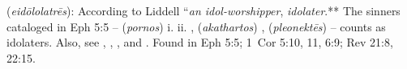 \item[Idolater,]

(\textit{eidōlolatrēs}):
According to Liddell ``\emph{an idol-worshipper}, \emph{idolater}.** The sinners cataloged in Eph 5:5 --  (\emph{pornos}) i.  ii. ,  (\emph{akathartos}) ,  (\emph{pleonektēs})  -- counts as idolaters. Also, see , , , and .
Found in Eph 5:5; 1~Cor 5:10, 11, 6:9; Rev 21:8, 22:15.
